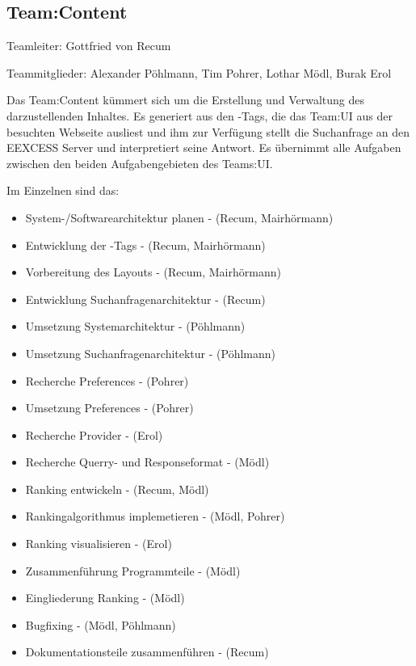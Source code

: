 \author{Gottfried von Recum}
\subsection{Team:Content}

Teamleiter: Gottfried von Recum

Teammitglieder: Alexander Pöhlmann, Tim Pohrer, Lothar Mödl, Burak Erol

Das Team:Content kümmert sich um die Erstellung und Verwaltung des darzustellenden Inhaltes. Es generiert aus den \SEARCH-Tags, die das Team:UI aus der besuchten Webseite ausliest und ihm zur Verfügung stellt die Suchanfrage an den EEXCESS Server und interpretiert seine Antwort. Es übernimmt alle Aufgaben zwischen den beiden Aufgabengebieten des Teams:UI.

Im Einzelnen sind das:

\begin{itemize}
	\item System-/Softwarearchitektur planen - (Recum, Mairhörmann)
	\item Entwicklung der \SEARCH-Tags - (Recum, Mairhörmann)
	\item Vorbereitung des Layouts - (Recum, Mairhörmann)
	\item Entwicklung Suchanfragenarchitektur - (Recum)
	\item Umsetzung Systemarchitektur - (Pöhlmann)
	\item Umsetzung Suchanfragenarchitektur - (Pöhlmann)
	\item Recherche Preferences - (Pohrer)
	\item Umsetzung Preferences - (Pohrer)
	\item Recherche Provider - (Erol)
	\item Recherche Querry- und Responseformat - (Mödl)
	\item Ranking entwickeln - (Recum, Mödl)
	\item Rankingalgorithmus implemetieren - (Mödl, Pohrer)
	\item Ranking visualisieren - (Erol)
	\item Zusammenführung Programmteile - (Mödl)
	\item Eingliederung Ranking - (Mödl)
	\item Bugfixing - (Mödl, Pöhlmann)
	\item Dokumentationsteile zusammenführen - (Recum)\\	
\end{itemize}